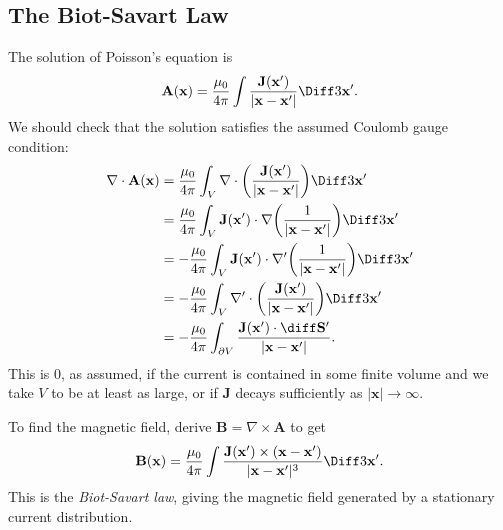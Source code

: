 \documentclass[12pt]{article}
\begin{document}
\subsection{The Biot-Savart Law}
\label{sub:the_biot_savart_law}

The solution of Poisson's equation is
\[
\mathbf{A}(\mathbf{x}) = \frac{\mu_0}{4 \pi} \int \frac{\mathbf{J}(\mathbf{x}')}{|\mathbf{x} - \mathbf{x}'|} \Diff3 \mathbf{x}'
.\]
We should check that the solution satisfies the assumed Coulomb gauge condition:
\begin{align*}
	\nabla \cdot \mathbf{A}(\mathbf{x}) &= \frac{\mu_0}{4 \pi} \int_{V} \nabla \cdot \biggl( \frac{\mathbf{J}(\mathbf{x}')}{|\mathbf{x} - \mathbf{x}'|} \biggr) \Diff3 \mathbf{x}' \\
					    &= \frac{\mu_0}{4 \pi} \int_{V} \mathbf{J}(\mathbf{x}') \cdot \nabla \biggl( \frac{1}{|\mathbf{x} - \mathbf{x}'|} \biggr) \Diff3 \mathbf{x}' \\
					    &= - \frac{\mu_0}{4 \pi} \int_{V} \mathbf{J}(\mathbf{x}') \cdot \nabla' \biggl( \frac{1}{|\mathbf{x} - \mathbf{x}'|} \biggr) \Diff3 \mathbf{x}' \\
					    &= - \frac{\mu_0}{4 \pi} \int_{V} \nabla' \cdot \biggl( \frac{\mathbf{J}(\mathbf{x}')}{|\mathbf{x} - \mathbf{x}'|} \biggr) \Diff3 \mathbf{x}' \\
					    &= - \frac{\mu_0}{4 \pi} \int_{\partial V} \frac{\mathbf{J}(\mathbf{x}') \cdot \diff \mathbf{S}'}{|\mathbf{x} - \mathbf{x}'|}.
\end{align*}
This is $0$, as assumed, if the current is contained in some finite volume and we take $V$ to be at least as large, or if $\mathbf{J}$ decays sufficiently as $|\mathbf{x}| \to \infty$.

To find the magnetic field, derive $\mathbf{B} = \nabla \times \mathbf{A}$ to get
\[
\mathbf{B}(\mathbf{x}) = \frac{\mu_0}{4 \pi} \int \frac{\mathbf{J}(\mathbf{x}') \times (\mathbf{x} - \mathbf{x}')}{|\mathbf{x} - \mathbf{x}'|^3} \Diff3 \mathbf{x}'
.\]
This is the \emph{Biot-Savart law}, giving the magnetic field generated by a stationary current distribution.
\end{document}
